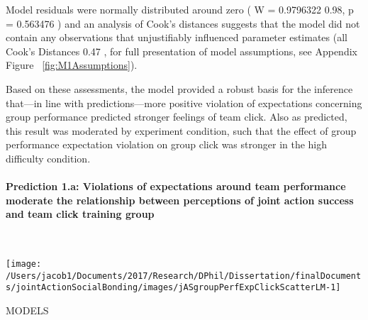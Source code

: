 \documentclass[english]{article}\usepackage[]{graphicx}\usepackage[]{color}
\makeatletter
\def\maxwidth{ %
  \ifdim\Gin@nat@width>\linewidth
    \linewidth
  \else
    \Gin@nat@width
  \fi
}
\newenvironment{kframe}{%
 \def\at@end@of@kframe{}%
 \ifinner\ifhmode%
  \def\at@end@of@kframe{\end{minipage}}%
  \begin{minipage}{\columnwidth}%
 \fi\fi%
 \def\FrameCommand##1{\hskip\@totalleftmargin \hskip-\fboxsep
 \colorbox{shadecolor}{##1}\hskip-\fboxsep
     \hskip-\linewidth \hskip-\@totalleftmargin \hskip\columnwidth}%
 \MakeFramed {\advance\hsize-\width
   \@totalleftmargin\z@ \linewidth\hsize
   \@setminipage}}%
 {\par\unskip\endMakeFramed%
 \at@end@of@kframe}
\newenvironment{knitrout}{}{} %
\newcommand{\myparagraph}[1]{\paragraph{#1}\mbox{}\\}
\newcommand{\pvalue}{p =}
\newcommand{\resdist}{W = }
\newcommand{\cooksD}{Cook's Distances}
\makeatother
\begin{document}
 Model residuals were normally distributed around zero
(
  \resdist
    0.9796322 0.98,
  \pvalue
    0.563476
)
and an analysis of Cook's distances suggests that the model did not contain any observations that unjustifiably influenced parameter estimates
(all
  \cooksD
    0.47
  ,
  for full presentation of model assumptions, see Appendix Figure ~\ref{fig:M1Assumptions}).

Based on these assessments, the model provided a robust basis for the inference that---in line with predictions---more positive violation of expectations concerning group performance predicted stronger feelings of team click. Also as predicted, this result was moderated by experiment condition, such that the effect of group performance expectation violation on group click was stronger in the high difficulty condition.





\myparagraph{Prediction 1.a: Violations of expectations around team performance moderate the relationship between perceptions of joint action success and team click training group}

\begin{knitrout}
\color{fgcolor}\begin{kframe}


{\ttfamily\noindent\itshape\color{messagecolor}{\#\# Saving 3.5 x 3.5 in image}}

{\ttfamily\noindent\color{warningcolor}{\#\# Warning: Removed 1 rows containing missing values (geom\_point).}}

{\ttfamily\noindent\color{warningcolor}{\#\# Warning: Removed 1 rows containing missing values (geom\_point).}}\end{kframe}

{\centering \texttt{[image: /Users/jacob1/Documents/2017/Research/DPhil/Dissertation/finalDocuments/jointActionSocialBonding/images/jASgroupPerfExpClickScatterLM-1]} 

}



\end{knitrout}



MODELS
\end{document}
